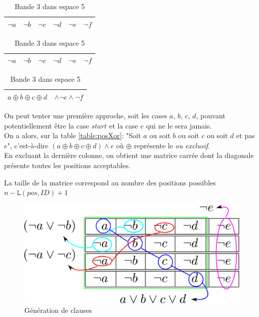 \documentclass[a4paper,12pt]{report}
\newcommand\black{\cellcolor{black}}
\newcommand\grey{\cellcolor{black!50}}
\begin{document}
\begin{table}[H]
\begin{subtable}[B]{0.5\textwidth}
			\begin{tabular}{|c|c|c|c||c|c|}
			\hline 
			$\lnot a$ & $\lnot b$ &\grey \color{gray}$\lnot$\color{white}$c$ & 
			\black \color{white}$\lnot d$ &\black \color{white}$\lnot e$  & $\lnot f$\\ 
			\hline
			\end{tabular}

			\begin{tabular}{|c|c|c|c||c|c|}
			\hline 
			$\lnot a$ & $\lnot b$ & $\lnot c$  &\grey \color{gray}$\lnot$\color{white}$d$ & 
			\black \color{white}$\lnot e$ &\black \color{white}$\lnot f$  \\ 
			\hline
			\end{tabular}

			\begin{tabular}{|c c c c c c|}
			\hline 
			\multicolumn{4}{|c||}{$a \oplus b \oplus c \oplus d$} & \multicolumn{2}{c|}{$\wedge \lnot e \wedge \lnot f$} \\ 
			\hline
			\end{tabular}			
			
        \caption{Bande 3 dans espace 5}
        \label{table:tailleE}
    \end{subtable}
\end{table}

On peut tenter une première approche, soit les cases $a$, $b$, $c$, $d$, pouvant potentiellement être la case $start$ et la case $e$ qui ne le sera jamais. \\
On a alors, sur la table \ref{table:posXor}: "Soit $a$ ou soit $b$ ou soit $c$ ou soit $d$ et pas $e$", c'est-à-dire $(a \oplus b \oplus c \oplus d) \wedge e$ où $\oplus$ représente le \textit{ou exclusif}.\\

En excluant la dernière colonne, on obtient une matrice carrée dont la diagonale présente toutes les positions acceptables. 

La taille de la matrice correspond au nombre des positions possibles $n-\mathtt{L}(pos,ID)+1$\\
\begin{figure}[H]
\centering
\includegraphics[scale=0.3]{generationFNC.png}
\caption{Génération de clauses}
\label{fig:generationFNC}
\end{figure}
\end{document}
